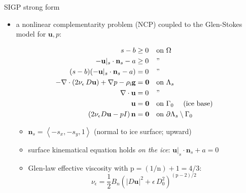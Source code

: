 \documentclass{beamer}
\newcommand{\tikzmark}[1]{\tikz[overlay,remember picture] \node (#1) {};}
\newcommand{\eps}{\epsilon}
\newcommand{\bn}{\mathbf{n}}
\newcommand{\bu}{\mathbf{u}}
\newcommand{\bzero}{\bm{0}}
\newcommand{\rhoi}{\rho_{\text{i}}}
\newcommand{\pp}{{\text{p}}}
\begin{document}
\begin{frame}{SIGP strong form}

\begin{itemize}
\item \alert{a nonlinear complementarity problem (NCP) coupled to the Glen-Stokes model for $\bu,p$:}

\vspace{-5mm}

\begin{align*}
s - b &\ge 0 && \text{on $\Omega$} & \tikzmark{first} \\
- \bu|_s \cdot \bn_s - a &\ge 0 && \text{''} \\
(s - b) (- \bu|_s \cdot \bn_s - a) &= 0 && \text{''} & \tikzmark{second} \\
- \nabla \cdot \left(2 \nu_\eps\, D\bu\right) + \nabla p - \rhoi \mathbf{g} &= \bzero && \text{on $\Lambda_s$} \\
\nabla \cdot \bu &= 0 && \text{''} \\
\bu &= \bzero && \text{on $\Gamma_0$ \quad (ice base)} \\
\left(2 \nu_\eps D\bu - pI\right) \bn &= \bzero && \text{on $\partial \Lambda_s \setminus \Gamma_0$}
\end{align*}


\vspace{-2mm}

    \begin{itemize}
    \item $\bn_s = \left<-s_x,-s_y,1\right>$  \quad (normal to ice surface; upward)
    \item surface kinematical equation holds \emph{on the ice}: \quad $\bu|_s \cdot \bn_s + a=0$
    \item Glen-law effective viscosity with $\text{p}=(1/\text{n})+1=4/3$:
      $$\nu_\eps = \frac{1}{2} B_n \left(|D\bu|^2 + \eps\, D_0^2\right)^{(\pp-2)/2}$$
    \end{itemize}
\end{itemize}
\end{frame}
\end{document}
